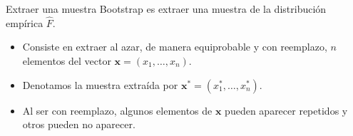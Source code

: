 \begin{tcolorbox}[colback=blue!5!white, colframe=blue!75!black, title=\textbf{Muestra Bootstrap}]
Extraer una muestra Bootstrap es extraer una muestra de la distribución empírica $\hat{F}$.
\begin{itemize}[label=\textbullet]
    \item Consiste en extraer al azar, de manera equiprobable y con reemplazo, $n$ elementos del vector $\mathbf{x}=(x_1,\dots,x_n)$.
    \item Denotamos la muestra extraída por $\mathbf{x}^*=(x_1^*,\dots,x_n^*)$.
    \item Al ser con reemplazo, algunos elementos de $\mathbf{x}$ pueden aparecer repetidos y otros pueden no aparecer.
\end{itemize}
\end{tcolorbox}
